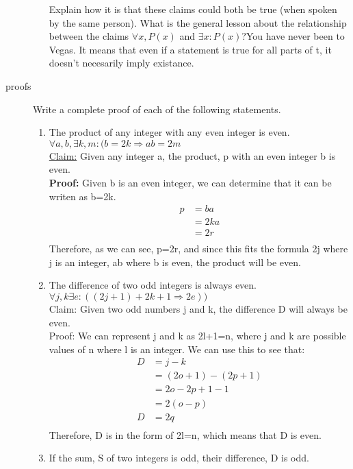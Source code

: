 \documentclass{letter}
\theoremstyle{definition}
\begin{document}
\begin{description}
\begin{enumerate}
			Explain how it is that these claims could both be true (when spoken by the same person). What is the general lesson about the relationship between the claims $\forall x, P(x)$ and $\exists x: P(x)$?You have never been to Vegas. It means that even if a statement is true for all parts of t, it doesn't necesarily imply existance.
\end{enumerate}
\item[proofs] Write a complete proof of each of the following statements.
	\begin{enumerate}
		\item The product of any integer with any even integer is even.
$\forall a, b,\exists k, m:(b=2k \Rightarrow ab=2m$ \\
\underline{Claim:} Given any integer a, the product, p with an even integer b is even. \\
\textbf{Proof:} Given b is an even integer, we can determine that it can be writen as b=2k.
\begin{align*}
p &= ba \\
 &= 2ka \tag{Replaces b with 2k} \\
 &= 2r \tag{Uses r to represent ka} \\
\end{align*} 
Therefore, as we can see, p=2r, and since this fits the formula 2j where j is an integer, ab where b is even, the product will be even.
		\item The difference of two odd integers is always even.
$  \forall j, k \exists e:((2j+1)+2k+1 \Rightarrow 2e)) $ \\
Claim: Given two odd numbers j and k, the difference D will always be even. \\
Proof: We can represent j and k as 2l+1=n, where j and k are possible values of n where l is an integer. We can use this to see that:
\begin{align*}
D &= j-k \\
&= (2o+1)-(2p+1) \tag{Replaced j with 2o+1 and k with 2p+1} \\
&= 2o-2p+1-1 \tag{distributed negative one} \\
&= 2(o-p) \tag{Subtracted ones and factored out 2.} \\
D &= 2q \tag{rewrote (o-p) as q} \\
\end{align*}
Therefore, D is in the form of 2l=n, which means that D is even. \\
		\item If the sum, S of two integers is odd, their difference, D is odd. \\

\end{enumerate}
\end{description}
\end{document}
